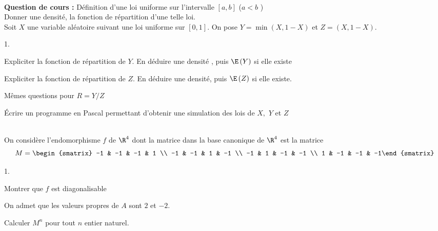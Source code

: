 \documentclass[11pt]{article}%
\begin{document}
\newpage

\begin{exerciceAP}~\\
  \textbf{Question de cours :} Définition d'une loi uniforme sur
  l'intervalle $\left[ a,b\right] $ ($a<b$ )\\
  Donner une densité, la fonction de répartition d'une telle loi.
  \\
  Soit $X$ une variable aléatoire suivant une loi uniforme sur $\left[ 0,1%
  \right] $. On pose $Y=\min \left( X,1-X\right) $ et $Z=\left( X,1-X\right) $.

  \begin{noliste}{1.}
    \setlength{\itemsep}{2mm}
  \item Expliciter la fonction de répartition de $Y$. En déduire une
    densité , puis $\E\left( Y\right) $ si elle existe

  \item Expliciter la fonction de répartition de $Z$. En déduire une
    densité, puis $\E\left( Z\right) $ si elle existe. 

  \item Mêmes questions pour $R=Y/Z$

  \item Écrire un programme en Pascal permettant d'obtenir une simulation des
    lois de $X,$ $Y$ et $Z$
  \end{noliste}
\end{exerciceAP}


\begin{exerciceSP}~\\
  On considère l'endomorphisme $f$ de $\R^{4}$ dont la matrice dans la
  base canonique de $\R^{4}$ est la matrice
  \[
  M =
  \begin{smatrix}
    -1 & -1 & -1 & 1 \\
    -1 & -1 & 1 & -1 \\
    -1 & 1 & -1 & -1 \\
    1 & -1 & -1 & -1%
  \end{smatrix}%
  \]

  \begin{noliste}{1.}
    \setlength{\itemsep}{2mm}
  \item Montrer que $f$ est diagonalisable
    
  \item On admet que les valeurs propres de $A$ sont $2$ et $-2.$
    
    Calculer $M^{n}$ pour tout $n$ entier naturel.
  \end{noliste}
\end{exerciceSP}
\end{document}
